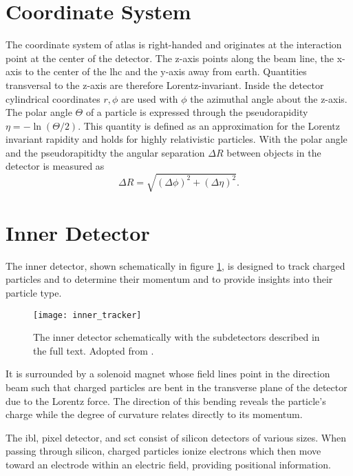 \section{Coordinate System}
The coordinate system of \ac{atlas} is right-handed and originates at the interaction point at the center of the detector. The z-axis points along the beam line, the x-axis to the center of the \ac{lhc} and the y-axis away from earth. Quantities transversal to the z-axis are therefore Lorentz-invariant. Inside the detector cylindrical coordinates $r,\phi$ are used with $\phi$ the azimuthal angle about the z-axis. The polar angle $\Theta$ of a particle is expressed through the pseudorapidity $\eta=-\ln(\Theta/2)$. This quantity is defined as an approximation for the Lorentz invariant rapidity and holds for highly relativistic particles. With the polar angle and the pseudorapitidty the angular separation $\Delta R$ between objects in the detector is measured as
\begin{equation}
    \Delta R = \sqrt{(\Delta\phi)^2+(\Delta \eta)^2}.
    \label{eq:delta_R}
\end{equation}

\section{Inner Detector}\label{sec:inner_detector}
The inner detector, shown schematically in figure \ref{fig:inner_tracker}, is designed to track charged particles and to determine their momentum and to provide insights into their particle type.
\begin{figure}
    \centering
    \texttt{[image: inner\_tracker]}
    \caption[]{The inner detector schematically with the subdetectors described in the full text. Adopted from \citep{Potamianos:2016ptf}.}
    \label{fig:inner_tracker}
\end{figure}
It is surrounded by a solenoid magnet whose field lines point in the direction beam such that charged particles are bent in the transverse plane of the detector due to the Lorentz force. The direction of this bending reveals the particle's charge while the degree of curvature relates directly to its momentum.

The \ac{ibl}, pixel detector, and \ac{sct} consist of silicon detectors of various sizes. When passing through silicon, charged particles ionize electrons which then move toward an electrode within an electric field, providing positional information.

